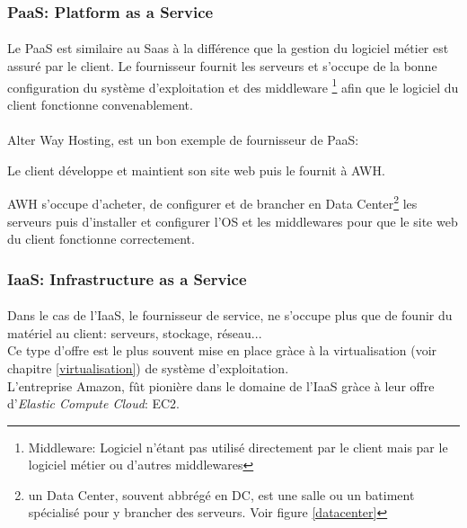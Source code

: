\subsubsection{PaaS: Platform as a Service}
\paragraph*{}
Le PaaS est similaire au Saas à la différence que la gestion du logiciel métier est assuré par le client.
Le fournisseur fournit les serveurs et s'occupe de la bonne configuration du système d'exploitation et des middleware
\footnote{Middleware: Logiciel n'étant pas utilisé directement par le client mais par le logiciel métier ou d'autres middlewares} afin
que le logiciel du client fonctionne convenablement.

\paragraph*{}
Alter Way Hosting, est un bon exemple de fournisseur de PaaS: \\
\begin{listi}
\item 	Le client développe et maintient son site web puis le fournit à AWH.\\
\item 	AWH s'occupe d'acheter, de configurer et de brancher en Data Center\footnote{un Data Center, souvent abbrégé en DC, est une salle
		ou un batiment spécialisé pour y brancher des serveurs. Voir figure \ref{datacenter}} les serveurs puis d'installer et configurer l'OS et les middlewares pour que
		le site web du client fonctionne correctement.
\end{listi}

\subsubsection{IaaS: Infrastructure as a Service}
\paragraph*{}
Dans le cas de l'IaaS, le fournisseur de service, ne s'occupe plus que de founir du matériel au client: serveurs, stockage, réseau...
\\
Ce type d'offre est le plus souvent mise en place gràce à la virtualisation (voir chapitre \ref{virtualisation}) de système d'exploitation.
\\
L'entreprise Amazon, fût pionière dans le domaine de l'IaaS gràce à leur offre d'\textsl{Elastic Compute Cloud}: EC2.

